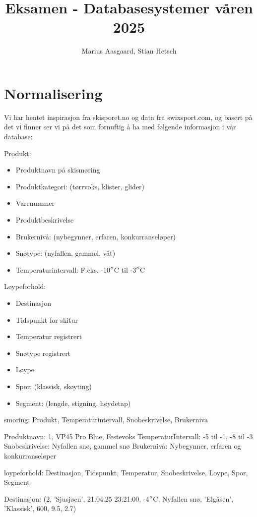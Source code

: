 \documentclass[12pt, a4paper]{article}
\title{Eksamen - Databasesystemer våren 2025}
\author{Marius Aasgaard, Stian Hetsch}
\begin{document}
\maketitle

\section{Normalisering}

Vi har hentet inspirasjon fra skisporet.no og data fra swixsport.com, og basert på det vi finner ser vi på det som fornuftig å ha med følgende informasjon i vår database:

Produkt:
\begin{itemize}
	\item Produktnavn på skismøring 
	\item Produktkategori: (tørrvoks, klister, glider) 
	\item Varenummer 
	\item Produktbeskrivelse
	\item Brukernivå: (nybegynner, erfaren, konkurranseløper) 
	\item Snøtype: (nyfallen, gammel, våt) 
	\item Temperaturintervall: F.eks. -10$\degree$C til -3$\degree$C 
\end{itemize}
Løypeforhold:
\begin{itemize}
	\item Destinasjon
	\item Tidspunkt for skitur 
	\item Temperatur registrert 
	\item Snøtype registrert 
	\item Løype 
	\item Spor: (klassisk, skøyting) 
	\item Segment: (lengde, stigning, høydetap)
\end{itemize}

smoring: Produkt, Temperaturintervall, Snobeskrivelse, Brukerniva

Produktnavn: 1, VP45 Pro Blue, Festevoks
TemperaturIntervall: -5 til -1, -8 til -3
Snobeskrivelse: Nyfallen snø, gammel snø
Brukernivå: Nybegynner, erfaren og konkurranseløper

loypeforhold: Destinasjon, Tidspunkt, Temperatur, Snobeskrivelse, Loype, Spor, Segment

Destinasjon: (2, 'Sjusjøen', 21.04.25 23:21:00, -4$\degree$C, Nyfallen snø, 'Elgåsen', 'Klassisk', 600, 9.5, 2.7)
\end{document}
